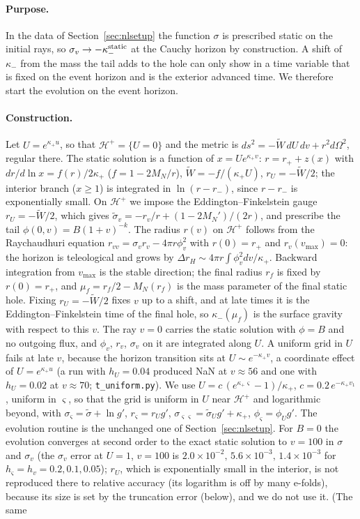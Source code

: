 \documentclass[11pt]{article}
\begin{document}
\paragraph{Purpose.} In the data of Section~\ref{sec:nlsetup} the function $\sigma$ is prescribed static on the initial rays, so $\sigma_v\to-\kappa_-^{\rm static}$ at the Cauchy horizon by construction. A shift of $\kappa_-$ from the mass the tail adds to the hole can only show in a time variable that is fixed on the event horizon and is the exterior advanced time. We therefore start the evolution on the event horizon.

\paragraph{Construction.} Let $U=e^{\kappa_+u}$, so that $\mathcal H^+=\{U=0\}$ and the metric is $ds^2=-\tilde W\,dU\,dv+r^2d\Omega^2$, regular there. The static solution is a function of $x=Ue^{\kappa_+v}$: $r=r_++z(x)$ with $dr/d\ln x=f(r)/2\kappa_+$ ($f=1-2M_N/r$), $\tilde W=-f/(\kappa_+U)$, $r_U=-\tilde W/2$; the interior branch ($x\ge1$) is integrated in $\ln(r-r_-)$, since $r-r_-$ is exponentially small. On $\mathcal H^+$ we impose the Eddington--Finkelstein gauge $r_U=-\tilde W/2$, which gives $\tilde\sigma_v=-r_v/r+(1-2M_N')/(2r)$, and prescribe the tail $\phi(0,v)=B(1+v)^{-k}$. The radius $r(v)$ on $\mathcal H^+$ follows from the Raychaudhuri equation $r_{vv}=\sigma_vr_v-4\pi r\phi_v^2$ with $r(0)=r_+$ and $r_v(v_{\max})=0$: the horizon is teleological and grows by $\Delta r_H\sim4\pi r\int\phi_v^2dv/\kappa_+$. Backward integration from $v_{\max}$ is the stable direction; the final radius $r_f$ is fixed by $r(0)=r_+$, and $\mu_f=r_f/2-M_N(r_f)$ is the mass parameter of the final static hole. Fixing $r_U=-\tilde W/2$ fixes $v$ up to a shift, and at late times it is the Eddington--Finkelstein time of the final hole, so $\kappa_-(\mu_f)$ is the surface gravity with respect to this $v$. The ray $v=0$ carries the static solution with $\phi=B$ and no outgoing flux, and $\phi_v$, $r_v$, $\sigma_v$ on it are integrated along $U$. A uniform grid in $U$ fails at late $v$, because the horizon transition sits at $U\sim e^{-\kappa_+v}$, a coordinate effect of $U=e^{\kappa_+u}$ (a run with $h_U=0.04$ produced NaN at $v\approx56$ and one with $h_U=0.02$ at $v\approx70$; \texttt{t\_uniform.py}). We use $U=c\,(e^{\kappa_+\varsigma}-1)/\kappa_+$, $c=0.2\,e^{-\kappa_+v_1}$, uniform in $\varsigma$, so that the grid is uniform in $U$ near $\mathcal H^+$ and logarithmic beyond, with $\sigma_\varsigma=\tilde\sigma+\ln g'$, $r_\varsigma=r_Ug'$, $\sigma_{\varsigma\varsigma}=\tilde\sigma_Ug'+\kappa_+$, $\phi_\varsigma=\phi_Ug'$. The evolution routine is the unchanged one of Section~\ref{sec:nlsetup}. For $B=0$ the evolution converges at second order to the exact static solution to $v=100$ in $\sigma$ and $\sigma_v$ (the $\sigma_v$ error at $U=1$, $v=100$ is $2.0\times10^{-2},\,5.6\times10^{-3},\,1.4\times10^{-3}$ for $h_\varsigma=h_v=0.2,0.1,0.05$); $r_U$, which is exponentially small in the interior, is not reproduced there to relative accuracy (its logarithm is off by many e-folds), because its size is set by the truncation error (below), and we do not use it. (The same 
\end{document}
